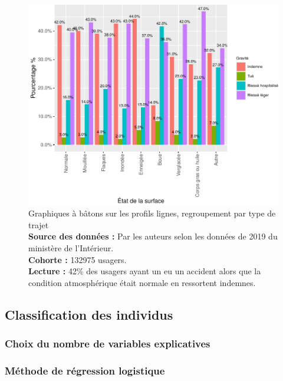 \documentclass[french,]{tp}
\begin{document}
\begin{figure}[ht!]

{\centering \includegraphics{Prediction_Gravite_files/figure-latex/barplotsurface-1} 

}

\caption{Graphiques à bâtons sur les profils lignes, regroupement par type de trajet\\
\textbf{Source des données :} Par les auteurs selon les données de 2019 du ministère de l'Intérieur.\\
\textbf{Cohorte :} 132975 usagers.\\
\textbf{Lecture :} 42\% des usagers ayant un eu un accident alors que la condition atmosphérique était normale en ressortent indemnes.}\label{fig:barplotsurface}
\end{figure}

\hypertarget{classification-des-individus}{%
\subsection{Classification des individus}\label{classification-des-individus}}

\hypertarget{choix-du-nombre-de-variables-explicatives}{%
\subsubsection{Choix du nombre de variables explicatives}\label{choix-du-nombre-de-variables-explicatives}}

\hypertarget{muxe9thode-de-ruxe9gression-logistique}{%
\subsubsection{Méthode de régression logistique}\label{muxe9thode-de-ruxe9gression-logistique}}
\end{document}
